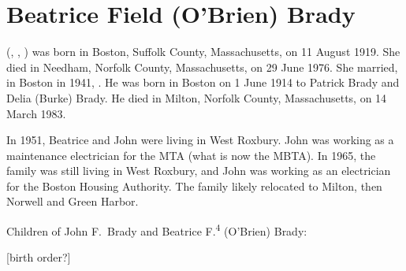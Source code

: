 \section{Beatrice Field (O'Brien) Brady}

 (, , ) was born in Boston, Suffolk County, Massachusetts, on 11 August 1919.\cite{Beatrice4OBrienBirth} She died in Needham, Norfolk County, Massachusetts, on 29 June 1976.\cite{Beatrice4OBrienDeath} She married, in Boston in 1941, .\cite{Beatrice4OBrienMarriage} He was born in Boston on 1 June 1914 to Patrick Brady and Delia (Burke) Brady.\cite{JohnBradyDraft,Census1920JohnBrady,PatrickBradyMarriage} He died in Milton, Norfolk County, Massachusetts, on 14 March 1983.\cite{JohnBradyDeath}

In 1951, Beatrice and John were living in West Roxbury. John was working as a maintenance electrician for the MTA (what is now the MBTA).\cite{JohnBrady1951,HistoryoftheT} In 1965, the family was still living in West Roxbury, and John was working as an electrician for the Boston Housing Authority.\cite{JohnBrady1965} The family likely relocated to Milton, then Norwell and Green Harbor.\cite{Beatrice4OBrienObit}

\begin{KidsIntro}
	Children of John F.\ Brady and Beatrice F.\textsuperscript{4} (O'Brien) Brady:
\end{KidsIntro}

\begin{Kids}
	
	
	
\end{Kids}

[birth order?]

